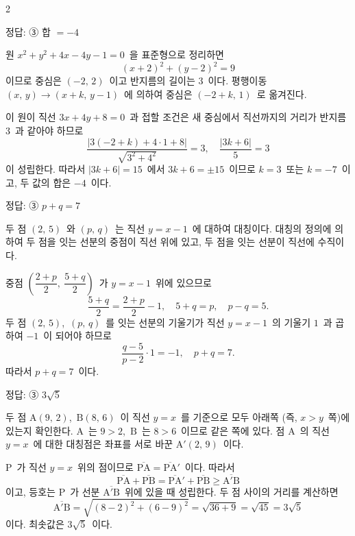 \documentclass[10pt,fleqn]{article}
\begin{document}
\begin{multicols*}{2}
\begin{dmanswerbox}
정답: ③ 합 $=-4$
\end{dmanswerbox}

원 $x^2+y^2+4x-4y-1=0$\ 을 표준형으로 정리하면
\[ (x+2)^2+(y-2)^2 = 9 \]
이므로 중심은 $(-2,\,2)$\ 이고 반지름의 길이는 $3$\ 이다. 평행이동 $(x,\,y)\to(x+k,\,y-1)$\ 에 의하여 중심은 $(-2+k,\,1)$\ 로 옮겨진다.

이 원이 직선 $3x+4y+8=0$\ 과 접할 조건은 새 중심에서 직선까지의 거리가 반지름 $3$\ 과 같아야 하므로
\[ \dfrac{|3(-2+k)+4\cdot 1+8|}{\sqrt{3^2+4^2}} = 3,\quad \dfrac{|3k+6|}{5} = 3 \]
이 성립한다. 따라서 $|3k+6|=15$\ 에서 $3k+6=\pm 15$\ 이므로 $k=3$\ 또는 $k=-7$\ 이고, 두 값의 합은 $-4$\ 이다.

\begin{dmanswerbox}
정답: ③ $p+q=7$
\end{dmanswerbox}

두 점 $(2,\,5)$\ 와 $(p,\,q)$\ 는 직선 $y=x-1$\ 에 대하여 대칭이다. 대칭의 정의에 의하여 두 점을 잇는 선분의 중점이 직선 위에 있고, 두 점을 잇는 선분이 직선에 수직이다.

중점 $\left(\dfrac{2+p}{2},\ \dfrac{5+q}{2}\right)$\ 가 $y=x-1$\ 위에 있으므로
\[ \dfrac{5+q}{2} = \dfrac{2+p}{2}-1,\quad 5+q = p,\quad p-q=5. \]
두 점 $(2,\,5)$,\ $(p,\,q)$\ 를 잇는 선분의 기울기가 직선 $y=x-1$\ 의 기울기 $1$\ 과 곱하여 $-1$\ 이 되어야 하므로
\[ \dfrac{q-5}{p-2}\cdot 1 = -1,\quad p+q=7. \]
따라서 $p+q=7$\ 이다.

\begin{dmanswerbox}
정답: ③ $3\sqrt{5}$
\end{dmanswerbox}

두 점 $\mathrm{A}(9,\,2)$,\ $\mathrm{B}(8,\,6)$\ 이 직선 $y=x$\ 를 기준으로 모두 아래쪽 (즉, $x>y$\ 쪽)에 있는지 확인한다. $\mathrm{A}$\ 는 $9>2$,\ $\mathrm{B}$\ 는 $8>6$\ 이므로 같은 쪽에 있다. 점 $\mathrm{A}$\ 의 직선 $y=x$\ 에 대한 대칭점은 좌표를 서로 바꾼 $\mathrm{A}'(2,\,9)$\ 이다.

$\mathrm{P}$\ 가 직선 $y=x$\ 위의 점이므로 $\overline{\mathrm{PA}}=\overline{\mathrm{PA}}'$\ 이다. 따라서
\[ \overline{\mathrm{PA}}+\overline{\mathrm{PB}} = \overline{\mathrm{PA}}'+\overline{\mathrm{PB}} \ge \overline{\mathrm{A}'\mathrm{B}} \]
이고, 등호는 $\mathrm{P}$\ 가 선분 $\overline{\mathrm{A}'\mathrm{B}}$\ 위에 있을 때 성립한다. 두 점 사이의 거리를 계산하면
\[ \overline{\mathrm{A}'\mathrm{B}} = \sqrt{(8-2)^2+(6-9)^2} = \sqrt{36+9} = \sqrt{45} = 3\sqrt{5} \]
이다. 최솟값은 $3\sqrt{5}$\ 이다.


\end{multicols*}
\end{document}
